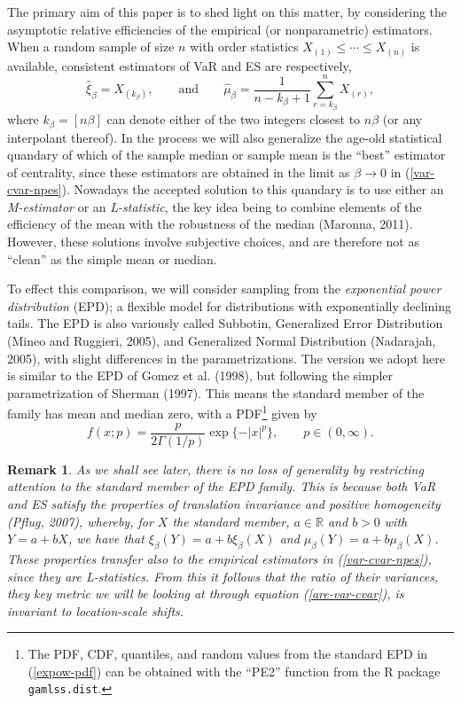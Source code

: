 \documentclass[11pt]{article}
\newcommand{\R}{{\mathbb R}}
\newcommand{\be}{\begin{equation}}
\newcommand{\ee}{\end{equation}}
\newcommand{\etal}{et al.}
\newcommand{\dist}{distribution}
\newcommand{\var}{\ensuremath{\xi_{\beta}}}
\newcommand{\cvar}{\ensuremath{\mu_{\beta}}}
\newcommand{\hvar}{\ensuremath{\hat{\xi}_{\beta}}}
\newcommand{\hcvar}{\ensuremath{\hat{\mu}_{\beta}}}
\newcommand{\al}{\ensuremath{\beta}}
\newcommand{\ka}{\ensuremath{k_{\beta}}}
\newcommand{\nc}{\normalcolor}
\newtheorem{remk}{Remark}%
\begin{document}
The primary
aim of this paper is to shed light on this matter, by considering the
asymptotic relative efficiencies of the  empirical (or
nonparametric) estimators. 
When a random sample of size $n$ with order
statistics $X_{(1)}\leq\cdots\leq X_{(n)}$ is available, consistent estimators of VaR and ES are respectively,
\begin{equation}\label{var-cvar-npes}
\hvar = X_{(\ka)}, \qquad\text{and}\qquad\hcvar = \frac{1}{n-\ka+1}\sum_{r=\ka}^n X_{(r)}, 
\end{equation}
where $\ka=[n\al]$ can denote either of the two integers closest to
$n\al$ (or any interpolant thereof). In the process
we will also generalize the age-old statistical quandary of which of
the sample median or sample mean is the ``best'' estimator of
centrality, since these estimators are obtained in the limit as
$\al\rightarrow 0$ in (\ref{var-cvar-npes}).  Nowadays the accepted
solution to this quandary is to use either an \emph{M-estimator} or an
\emph{L-statistic}, the key idea being to combine elements of the efficiency of the mean
with the robustness of the median (Maronna, 2011). However, these
solutions involve subjective choices, and are therefore not as
``clean'' as the simple mean or median.\nc

To effect this comparison, we will consider sampling from the
\emph{exponential power \dist{}} (EPD); a flexible model for
distributions with exponentially declining tails. The EPD is also variously called
  Subbotin, Generalized Error Distribution (Mineo and Ruggieri,
  2005), and Generalized Normal Distribution (Nadarajah,
  2005), with slight differences in the parametrizations. The version
  we  adopt here is similar to the EPD of Gomez \etal{} (1998), but
  following the simpler parametrization of Sherman (1997). This means
  the standard member of the family has mean and median zero, with a PDF\footnote{The PDF, CDF, quantiles, and random
values from the standard EPD in (\ref{expow-pdf}) can be obtained with
the ``PE2'' function from the
R package \texttt{gamlss.dist}.} given by
\be\label{expow-pdf}
f(x;p) = \frac{p}{2\Gamma(1/p)}\exp\{-|x|^p\}, \qquad p\in (0,\infty).
\ee


\begin{remk}\label{rmk:why-std-gpd}
As we shall see later, there is no loss of generality by restricting
attention to the standard
member of the EPD family. This is because both VaR and ES satisfy the
properties of \emph{translation invariance} and \emph{positive
  homogeneity} (Pflug, 2007), whereby, for $X$ the standard member,
$a\in\R$ and $b>0$ with $Y=a+bX$, we have that
$\var(Y)=a+b\var(X)$ and  $\cvar(Y)=a+b\cvar(X)$. These properties
transfer also to the empirical estimators in (\ref{var-cvar-npes}),
since they are L-statistics. From this it follows that the ratio of
their variances, they key metric we will be looking at through
equation (\ref{are-var-cvar}), is invariant to location-scale shifts.
\end{remk}
\nc
\end{document}
